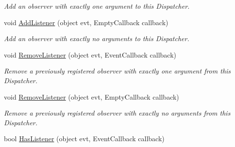 \begin{DoxyCompactItemize}
\begin{DoxyCompactList}\small\item\em Add an observer with exactly one argument to this Dispatcher. \end{DoxyCompactList}\item 
\hypertarget{classstrange_1_1extensions_1_1dispatcher_1_1eventdispatcher_1_1impl_1_1_event_dispatcher_a61076fe4f247acbb43fc8508d50aae54}{void \hyperlink{classstrange_1_1extensions_1_1dispatcher_1_1eventdispatcher_1_1impl_1_1_event_dispatcher_a61076fe4f247acbb43fc8508d50aae54}{Add\-Listener} (object evt, Empty\-Callback callback)}\label{classstrange_1_1extensions_1_1dispatcher_1_1eventdispatcher_1_1impl_1_1_event_dispatcher_a61076fe4f247acbb43fc8508d50aae54}

\begin{DoxyCompactList}\small\item\em Add an observer with exactly no arguments to this Dispatcher. \end{DoxyCompactList}\item 
\hypertarget{classstrange_1_1extensions_1_1dispatcher_1_1eventdispatcher_1_1impl_1_1_event_dispatcher_aad435ded199bca7ae03db48b6310d626}{void \hyperlink{classstrange_1_1extensions_1_1dispatcher_1_1eventdispatcher_1_1impl_1_1_event_dispatcher_aad435ded199bca7ae03db48b6310d626}{Remove\-Listener} (object evt, Event\-Callback callback)}\label{classstrange_1_1extensions_1_1dispatcher_1_1eventdispatcher_1_1impl_1_1_event_dispatcher_aad435ded199bca7ae03db48b6310d626}

\begin{DoxyCompactList}\small\item\em Remove a previously registered observer with exactly one argument from this Dispatcher. \end{DoxyCompactList}\item 
\hypertarget{classstrange_1_1extensions_1_1dispatcher_1_1eventdispatcher_1_1impl_1_1_event_dispatcher_a35c3f3a63639cde45a852bb6423c995e}{void \hyperlink{classstrange_1_1extensions_1_1dispatcher_1_1eventdispatcher_1_1impl_1_1_event_dispatcher_a35c3f3a63639cde45a852bb6423c995e}{Remove\-Listener} (object evt, Empty\-Callback callback)}\label{classstrange_1_1extensions_1_1dispatcher_1_1eventdispatcher_1_1impl_1_1_event_dispatcher_a35c3f3a63639cde45a852bb6423c995e}

\begin{DoxyCompactList}\small\item\em Remove a previously registered observer with exactly no arguments from this Dispatcher. \end{DoxyCompactList}\item 
\hypertarget{classstrange_1_1extensions_1_1dispatcher_1_1eventdispatcher_1_1impl_1_1_event_dispatcher_aa8c294f9857df12b30876ae1e709ca17}{bool \hyperlink{classstrange_1_1extensions_1_1dispatcher_1_1eventdispatcher_1_1impl_1_1_event_dispatcher_aa8c294f9857df12b30876ae1e709ca17}{Has\-Listener} (object evt, Event\-Callback callback)}\label{classstrange_1_1extensions_1_1dispatcher_1_1eventdispatcher_1_1impl_1_1_event_dispatcher_aa8c294f9857df12b30876ae1e709ca17}


\end{DoxyCompactItemize}
